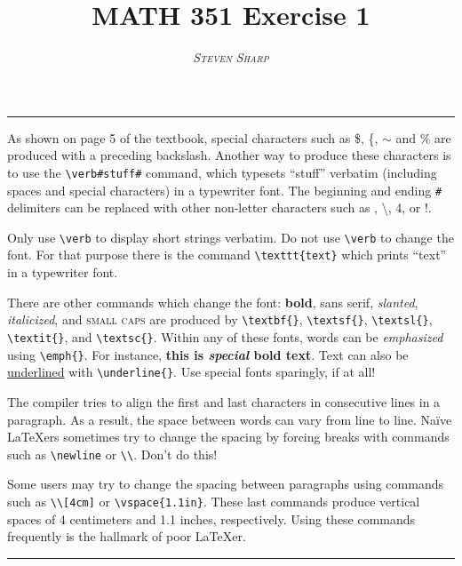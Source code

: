 \documentclass[10pt]{article}
\title{MATH 351 Exercise 1}
\author{\textsc{\textit{Steven Sharp}}}
\date{}
\begin{document}
\maketitle

\thispagestyle{empty}

\begin{center}
\rule{\textwidth}{0.5pt}
\end{center}

As shown on page 5 of the textbook, special characters such as \$, \{, $\sim$ and \% are produced with a preceding backslash. Another way to produce these characters is to use the \verb!\verb#stuff#! command, which typesets ``stuff'' verbatim (including spaces and special characters) in a typewriter font. The beginning and ending \verb!#! delimiters can be replaced with other non-letter characters such as \:{$\widehat{}$}\;, \textbackslash, 4, or !.

Only use \verb!\verb! to display short strings verbatim. Do not use \verb!\verb! to change the font. For that purpose there is the command \verb!\texttt{text}!  which prints ``text'' in a typewriter font.

There are other commands which change the font: \textbf{bold}, \textsf{sans serif}, \textsl{slanted}, \textit{italicized}, and \textsc{small caps} are produced by \verb!\textbf{}!, \verb!\textsf{}!, \verb!\textsl{}!, \verb!\textit{}!, and \verb!\textsc{}!. Within any of these fonts, words can be \emph{emphasized} using \verb!\emph{}!. For instance, \textbf{this is \emph{special} bold text}. Text can also be \underline{underlined} with \verb!\underline{}!. Use special fonts sparingly, if at all!

The compiler tries to align the first and last characters in consecutive lines in a paragraph. As a result, the space between words can vary from line to line. Naïve \LaTeX{}ers sometimes try to change the spacing by forcing breaks with commands such as \verb!\newline! or \verb!\\!. Don't do this!

 Some users may try to change the spacing between paragraphs using commands such as \verb!\\[4cm]! or \verb!\vspace{1.1in}!. These last commands produce vertical spaces of 4 centimeters and 1.1 inches, respectively. Using these commands frequently is the hallmark of poor \LaTeX{}er.

\begin{center}
\rule{\textwidth}{0.5pt}
\end{center}
\end{document}
